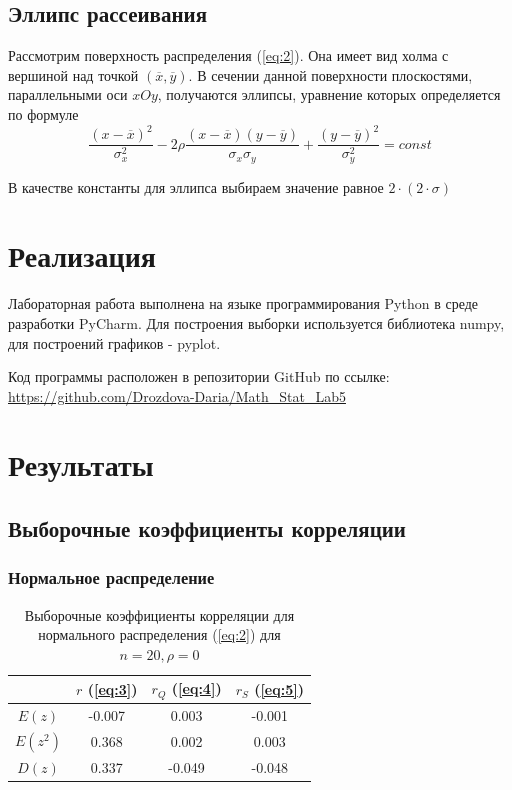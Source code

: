 \documentclass{article}
\begin{document}
\subsection{Эллипс рассеивания}

Рассмотрим поверхность распределения (\ref{eq:2}). Она имеет вид холма с вершиной над точкой $(\overline{x}, \overline{y})$. В сечении данной поверхности плоскостями, параллельными оси $xOy$, получаются эллипсы, уравнение которых определяется по формуле
\begin{equation}
\frac{(x - \overline{x})^2}{\sigma_x^2} - 2 \rho \frac{(x - \overline{x})(y - \overline{y})}{\sigma_x \sigma_y} + \frac{(y - \overline{y})^2}{\sigma_y^2} = const
\label{eq:6}
\end{equation}

В качестве константы для эллипса выбираем значение равное $2 \cdot (2 \cdot \sigma)$

\newpage
\section{Реализация}

Лабораторная работа выполнена на языке программирования Python в среде разработки PyCharm. Для построения выборки используется библиотека numpy, для построений графиков - pyplot.

Код программы расположен в репозитории GitHub по ссылке: \url{https://github.com/Drozdova-Daria/Math_Stat_Lab5}

\newpage
\section{Результаты}

\subsection{Выборочные коэффициенты корреляции}

\subsubsection{Нормальное распределение} \label{sec:1}

\begin{table} [hb]
\begin{center}
\begin{tabular}{|c|c|c|c|}
\hline 
 & $r$ (\ref{eq:3}) & $r_Q$ (\ref{eq:4}) & $r_S$ (\ref{eq:5}) \\ 
\hline 
$E(z)$ & -0.007 & 0.003 & -0.001 \\ 
\hline 
$E(z^2)$ & 0.368 & 0.002 & 0.003 \\ 
\hline 
$D(z)$ & 0.337 & -0.049 & -0.048 \\ 
\hline 
\end{tabular} 
\caption{Выборочные коэффициенты корреляции для нормального распределения (\ref{eq:2}) для $n = 20, \rho = 0$}
\end{center}
\end{table}
\end{document}
